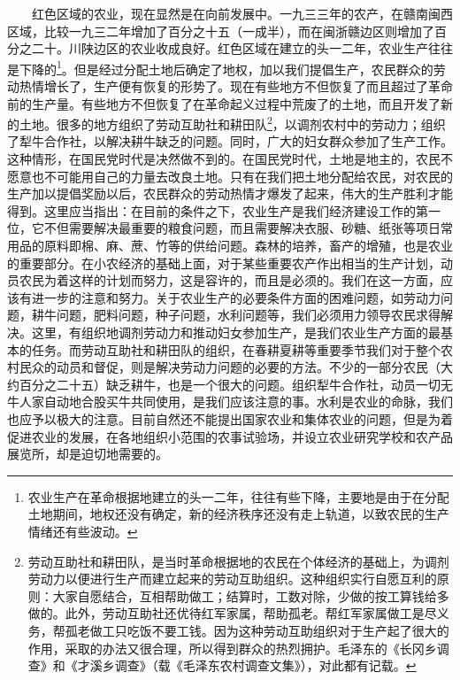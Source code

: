 \documentclass[cn,11pt,chinese]{elegantbook}
\begin{document}
　　红色区域的农业，现在显然是在向前发展中。一九三三年的农产，在赣南闽西区域，比较一九三二年增加了百分之十五（一成半），而在闽浙赣边区则增加了百分之二十。川陕边区的农业收成良好。红色区域在建立的头一二年，农业生产往往是下降的\footnote[1]{ 农业生产在革命根据地建立的头一二年，往往有些下降，主要地是由于在分配土地期间，地权还没有确定，新的经济秩序还没有走上轨道，以致农民的生产情绪还有些波动。}。但是经过分配土地后确定了地权，加以我们提倡生产，农民群众的劳动热情增长了，生产便有恢复的形势了。现在有些地方不但恢复了而且超过了革命前的生产量。有些地方不但恢复了在革命起义过程中荒废了的土地，而且开发了新的土地。很多的地方组织了劳动互助社和耕田队\footnote[2]{ 劳动互助社和耕田队，是当时革命根据地的农民在个体经济的基础上，为调剂劳动力以便进行生产而建立起来的劳动互助组织。这种组织实行自愿互利的原则：大家自愿结合，互相帮助做工；结算时，工数对除，少做的按工算钱给多做的。此外，劳动互助社还优待红军家属，帮助孤老。帮红军家属做工是尽义务，帮孤老做工只吃饭不要工钱。因为这种劳动互助组织对于生产起了很大的作用，采取的办法又很合理，所以得到群众的热烈拥护。毛泽东的《长冈乡调查》和《才溪乡调查》（载《毛泽东农村调查文集》），对此都有记载。}，以调剂农村中的劳动力；组织了犁牛合作社，以解决耕牛缺乏的问题。同时，广大的妇女群众参加了生产工作。这种情形，在国民党时代是决然做不到的。在国民党时代，土地是地主的，农民不愿意也不可能用自己的力量去改良土地。只有在我们把土地分配给农民，对农民的生产加以提倡奖励以后，农民群众的劳动热情才爆发了起来，伟大的生产胜利才能得到。这里应当指出：在目前的条件之下，农业生产是我们经济建设工作的第一位，它不但需要解决最重要的粮食问题，而且需要解决衣服、砂糖、纸张等项日常用品的原料即棉、麻、蔗、竹等的供给问题。森林的培养，畜产的增殖，也是农业的重要部分。在小农经济的基础上面，对于某些重要农产作出相当的生产计划，动员农民为着这样的计划而努力，这是容许的，而且是必须的。我们在这一方面，应该有进一步的注意和努力。关于农业生产的必要条件方面的困难问题，如劳动力问题，耕牛问题，肥料问题，种子问题，水利问题等，我们必须用力领导农民求得解决。这里，有组织地调剂劳动力和推动妇女参加生产，是我们农业生产方面的最基本的任务。而劳动互助社和耕田队的组织，在春耕夏耕等重要季节我们对于整个农村民众的动员和督促，则是解决劳动力问题的必要的方法。不少的一部分农民（大约百分之二十五）缺乏耕牛，也是一个很大的问题。组织犁牛合作社，动员一切无牛人家自动地合股买牛共同使用，是我们应该注意的事。水利是农业的命脉，我们也应予以极大的注意。目前自然还不能提出国家农业和集体农业的问题，但是为着促进农业的发展，在各地组织小范围的农事试验场，并设立农业研究学校和农产品展览所，却是迫切地需要的。\\
\end{document}
